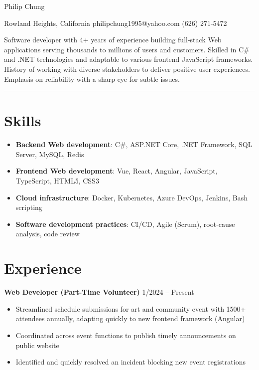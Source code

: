 \documentclass[12pt]{article}
\newcommand{\primaryheader}[4]{
	\textbf{#1}
	\ifthenelse{\equal{#3}{}}{}{%
		\symbol{"B7} #3 \ifthenelse{\equal{#4}{}}{}{(#4)}
	}
	\hfill #2%
}
\begin{document}
	{\centering

		{\headerfont\fontsize{24pt}{24pt}\selectfont Philip Chung}

		\vspace{0.25em}

		{\fontsize{10pt}{10pt}\selectfont Rowland Heights, California  philipchung1995@yahoo.com  (626) 271-5472}

	}

	\vspace{0.25em}

	{\fontsize{11pt}{14pt}\selectfont

		Software developer with 4+ years of experience building full-stack Web applications serving thousands to millions of users and customers. Skilled in C\# and .NET technologies and adaptable to various frontend JavaScript frameworks. History of working with diverse stakeholders to deliver positive user experiences. Emphasis on reliability with a sharp eye for subtle issues.

	}

	\rule{\textwidth}{1pt}

	\section*{Skills}

	\newcommand{\skillitem}[2]{\item \textbf{#1}: #2}

	\begin{itemize}[left=0.25in .. 0.25in,label={},itemindent=-0.25in]
		\skillitem{Backend Web development}{C\#, ASP.NET Core, .NET Framework, SQL Server, MySQL, Redis}
		\skillitem{Frontend Web development}{Vue, React, Angular, JavaScript, TypeScript, HTML5, CSS3}
		\skillitem{Cloud infrastructure}{Docker, Kubernetes, Azure DevOps, Jenkins, Bash scripting}
		\skillitem{Software development practices}{CI/CD, Agile (Scrum), root-cause analysis, code review}
	\end{itemize}

	\section*{Experience}

	\primaryheader{Web Developer (Part-Time Volunteer)}{1/2024 -- Present}{PNW}{Remote}

	\begin{itemize}
		\item Streamlined schedule submissions for art and community event with 1500+ attendees annually, adapting quickly to new frontend framework (Angular)
		\item Coordinated across event functions to publish timely announcements on public website
		\item Identified and quickly resolved an incident blocking new event registrations
	\end{itemize}
\end{document}

